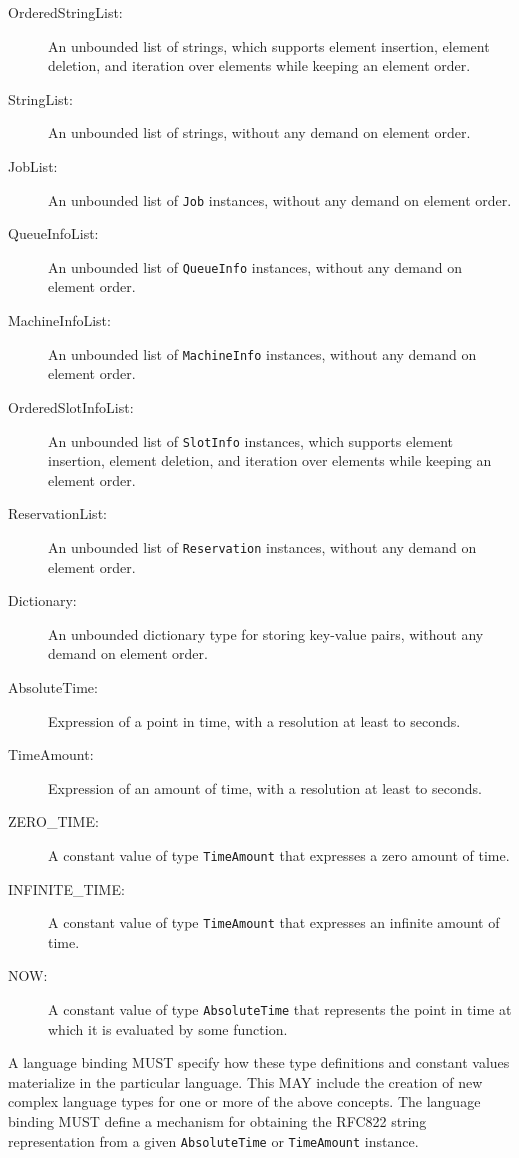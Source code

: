 \documentclass{article}
\newcommand{\h}[1]{\lstinline|#1|}
\newcommand{\langbind}[1]{\begin{shaded}#1\end{shaded}}
\begin{document}
\begin{description}
\item[OrderedStringList:] An unbounded list of strings, which supports element insertion, element deletion, and iteration over elements while keeping an element order.
\item[StringList:] An unbounded list of strings, without any demand on element order.
\item[JobList:] An unbounded list of \h{Job} instances, without any demand on element order.
\item[QueueInfoList:] An unbounded list of \h{QueueInfo} instances, without any demand on element order.
\item[MachineInfoList:] An unbounded list of \h{MachineInfo} instances, without any demand on element order.
\item[OrderedSlotInfoList:] An unbounded list of \h{SlotInfo} instances, which supports element insertion, element deletion, and iteration over elements while keeping an element order.
\item[ReservationList:] An unbounded list of \h{Reservation} instances, without any demand on element order.
\item[Dictionary:] An unbounded dictionary type for storing key-value pairs, without any demand on element order.
\item[AbsoluteTime:] Expression of a point in time, with a resolution at least to seconds. 
\item[TimeAmount:] Expression of an amount of time, with a resolution at least to seconds.
\item[ZERO\_TIME:] A constant value of type \h{TimeAmount} that expresses a zero amount of time.
\item[INFINITE\_TIME:] A constant value of type \h{TimeAmount} that expresses an infinite amount of time.
\item[NOW:] A constant value of type \h{AbsoluteTime} that represents the point in time at which it is evaluated by some function.

\end{description}

\langbind{
A language binding MUST specify how these type definitions and constant values materialize in the particular language. This MAY include the creation of new complex language types for one or more of the above concepts. The language binding MUST define a mechanism for obtaining the RFC822 string representation from a given \h{AbsoluteTime} or \h{TimeAmount} instance.
}
\end{document}
